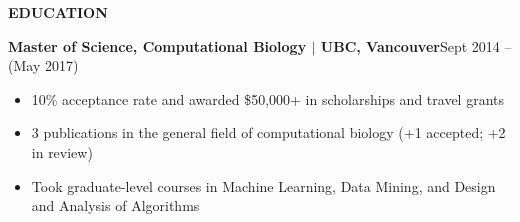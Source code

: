 \documentclass{res}
\renewcommand{\section}[1]{%
  \vspace{0.3in}%
  \centerline{\uppercase{\bf{#1}}}%
  \vspace{-6pt}}
\begin{document}
\begin{resume}
\section{Education}
{\bf Master of Science, Computational Biology $|$ UBC, Vancouver}\hfill{Sept 2014 -- (May 2017)}
\begin{itemize}
  \item 10\% acceptance rate and awarded \$50,000+ in scholarships and travel grants
  \item 3 publications in the general field of computational biology (+1 accepted; +2 in review)
  \item Took graduate-level courses in Machine Learning, Data Mining, and Design and Analysis of Algorithms
\end{itemize}
\pagebreak

\end{resume}
\end{document}
